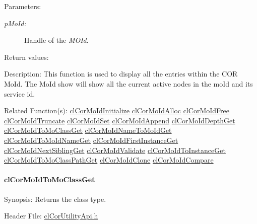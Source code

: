 \begin{Desc}
\item[Parameters:]
\begin{description}
\item[{\em p\-Mo\-Id:}]Handle of the {\em MOId\/}.\end{description}
\end{Desc}
\begin{Desc}
\item[Return values:]\end{Desc}
\begin{Desc}
\item[Description:]This function is used to display all the entries within the COR Mo\-Id. The Mo\-Id show will show all the current active nodes in the mo\-Id and its service id.\end{Desc}
\begin{Desc}
\item[Related Function(s):]\hyperlink{group__group13}{cl\-Cor\-Mo\-Id\-Initialize} \hyperlink{group__group13}{cl\-Cor\-Mo\-Id\-Alloc} \hyperlink{group__group13}{cl\-Cor\-Mo\-Id\-Free} \hyperlink{group__group13}{cl\-Cor\-Mo\-Id\-Truncate} \hyperlink{group__group13}{cl\-Cor\-Mo\-Id\-Set} \hyperlink{group__group13}{cl\-Cor\-Mo\-Id\-Append} \hyperlink{group__group13}{cl\-Cor\-Mo\-Id\-Depth\-Get} \hyperlink{group__group13}{cl\-Cor\-Mo\-Id\-To\-Mo\-Class\-Get} \hyperlink{group__group13}{cl\-Cor\-Mo\-Id\-Name\-To\-Mo\-Id\-Get} \hyperlink{group__group13}{cl\-Cor\-Mo\-Id\-To\-Mo\-Id\-Name\-Get} \hyperlink{group__group13}{cl\-Cor\-Mo\-Id\-First\-Instance\-Get} \hyperlink{group__group13}{cl\-Cor\-Mo\-Id\-Next\-Sibling\-Get} \hyperlink{group__group13}{cl\-Cor\-Mo\-Id\-Validate} \hyperlink{group__group13}{cl\-Cor\-Mo\-Id\-To\-Instance\-Get} \hyperlink{group__group13}{cl\-Cor\-Mo\-Id\-To\-Mo\-Class\-Path\-Get} \hyperlink{group__group13}{cl\-Cor\-Mo\-Id\-Clone} \hyperlink{group__group13}{cl\-Cor\-Mo\-Id\-Compare} \end{Desc}
\hypertarget{pagecor237}{}\paragraph{cl\-Cor\-Mo\-Id\-To\-Mo\-Class\-Get}\label{pagecor237}
\begin{Desc}
\item[Synopsis:]Returns the class type.\end{Desc}
\begin{Desc}
\item[Header File:]\hyperlink{cl_cor_utility_api_8h}{cl\-Cor\-Utility\-Api.h}\end{Desc}
